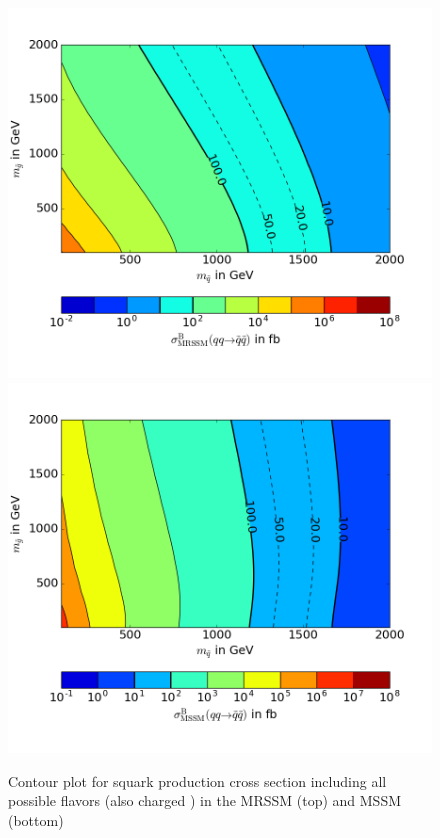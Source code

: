 \begin{figure}[!htpb]
\begin{center}
\includegraphics[scale=.6]{figures/contour_MRSSM_squarks}
\includegraphics[scale=.6]{figures/contour_MSSM_squarks}
\caption{Contour plot for squark production cross section including all possible flavors (also charged ) in the MRSSM (top) and MSSM (bottom) }\label{fig:ContourTree}
\end{center}
\end{figure}
